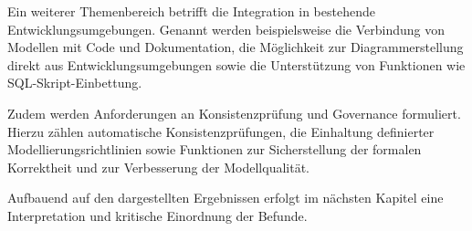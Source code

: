 Ein weiterer Themenbereich betrifft die Integration in bestehende Entwicklungsumgebungen. Genannt werden beispielsweise die Verbindung von Modellen mit Code und Dokumentation, die Möglichkeit zur Diagrammerstellung direkt aus Entwicklungsumgebungen sowie die Unterstützung von Funktionen wie SQL-Skript-Einbettung.

Zudem werden Anforderungen an Konsistenzprüfung und Governance formuliert. Hierzu zählen automatische Konsistenzprüfungen, die Einhaltung definierter Modellierungsrichtlinien sowie Funktionen zur Sicherstellung der formalen Korrektheit und zur Verbesserung der Modellqualität.

Aufbauend auf den dargestellten Ergebnissen erfolgt im nächsten Kapitel eine Interpretation und kritische Einordnung der Befunde.
